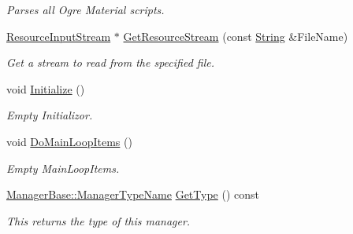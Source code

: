 \begin{DoxyCompactItemize}
\begin{DoxyCompactList}\small\item\em Parses all Ogre Material scripts. \item\end{DoxyCompactList}\item 
\hyperlink{classphys_1_1ResourceInputStream}{ResourceInputStream} $\ast$ \hyperlink{classphys_1_1ResourceManager_a13f0aef080b9a353fe6c910c2781de50}{GetResourceStream} (const \hyperlink{namespacephys_aa03900411993de7fbfec4789bc1d392e}{String} \&FileName)
\begin{DoxyCompactList}\small\item\em Get a stream to read from the specified file. \item\end{DoxyCompactList}\item 
void \hyperlink{classphys_1_1ResourceManager_a9be3250f1f1153c9e079f82736eb00a8}{Initialize} ()
\begin{DoxyCompactList}\small\item\em Empty Initializor. \item\end{DoxyCompactList}\item 
void \hyperlink{classphys_1_1ResourceManager_a2114714999441c095bc28d3673c2490e}{DoMainLoopItems} ()
\begin{DoxyCompactList}\small\item\em Empty MainLoopItems. \item\end{DoxyCompactList}\item 
\hyperlink{classphys_1_1ManagerBase_aaa6ccddf23892eaccb898529414f80a5}{ManagerBase::ManagerTypeName} \hyperlink{classphys_1_1ResourceManager_a9e5468e5428f5c108c7b3c01e94eba46}{GetType} () const 
\begin{DoxyCompactList}\small\item\em This returns the type of this manager. \item\end{DoxyCompactList}\end{DoxyCompactItemize}
